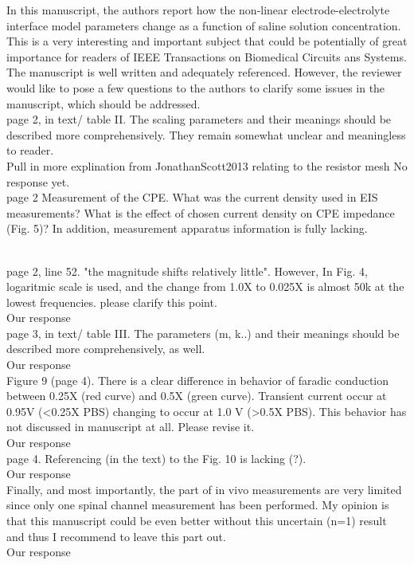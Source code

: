 \documentclass[journal, a4paper]{IEEEtran}
\begin{document}
{\color{blue}
In this manuscript, the authors report how the non-linear electrode-electrolyte interface model parameters change as a function of saline solution concentration. This is a very interesting and important subject that could be potentially of great importance for readers of IEEE Transactions on Biomedical Circuits ans Systems. The manuscript is well written and adequately referenced. However, the reviewer would like to pose a few questions to the authors to clarify some  issues in the manuscript, which should be addressed.\\

page 2, in text/ table II. The scaling parameters and their meanings should be described more comprehensively. They remain somewhat unclear and meaningless to reader.\\
{\color{OliveGreen}
    {\color{Red} Pull in more explination from JonathanScott2013 relating to the resistor mesh}
    No response yet.
}\\

page 2 Measurement of the CPE. What was the current density used in EIS measurements?
What is the effect of chosen current density on CPE impedance (Fig. 5)?
In addition,  measurement apparatus information is fully lacking.\\
{\color{OliveGreen}
    
}\\

page 2, line 52. "the magnitude shifts relatively little". However, In Fig. 4, logaritmic scale is used, and the change from 1.0X to 0.025X is almost 50k at the lowest frequencies. 
please clarify this point.\\
{\color{OliveGreen} Our response}\\

page 3, in text/ table III. The parameters (m, k..) and their meanings should be described more comprehensively, as well.\\
{\color{OliveGreen} Our response}\\

Figure 9 (page 4). There is a clear difference in behavior of faradic conduction between 0.25X (red curve) and 0.5X (green curve). Transient current occur at 0.95V (<0.25X PBS) changing to occur at 1.0 V (>0.5X PBS). This behavior has not discussed in manuscript at all. Please revise it.\\
{\color{OliveGreen} Our response}\\

page 4. Referencing (in the text) to the Fig. 10 is lacking (?).\\
{\color{OliveGreen} Our response}\\

Finally, and most importantly, the part of in vivo measurements are very limited since only one spinal channel measurement has been performed. My opinion is that this manuscript could be even better without this uncertain (n=1) result and thus I recommend to leave this part out.\\
{\color{OliveGreen} Our response}\\
}
\end{document}
